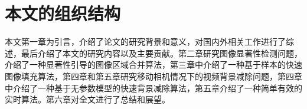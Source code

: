 \section{本文的组织结构}
本文第一章为引言，介绍了论文的研究背景和意义，对国内外相关工作进行了综述，最后介绍了本文的研究内容以及主要贡献。第二章研究图像显著性检测问题，介绍了一种显著性引导的图像区域合并算法，第三章中介绍了一种基于样本的快速图像填充算法，第四章和第五章研究移动相机情况下的视频背景减除问题，第四章中介绍了一种基于无参数模型的快速背景减除算法，第五章介绍了一种简单有效的实时算法。第六章对全文进行了总结和展望。
\label{sec:hierarchy} 